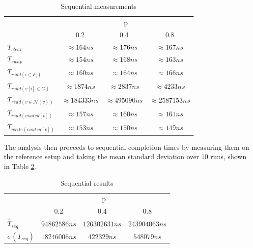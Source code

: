 \begin{table}
    \begin{center}
        \begin{tabular}{|| l | c | c | c ||}
            \hline
              & \multicolumn{3}{c||}{p} \\ \cline{2-4}
              & 0.2 & 0.4 & 0.8 \\ \hline \hline
             $T_{clear}$  & $\approx 164ns$& $\approx 176ns$& $\approx 167ns$
             \\ \hline 
             $T_{swap}$  & $\approx 154ns$& $\approx 168ns$& $\approx 163ns$
             \\ \hline 
             $T_{read(i \in F_i)}$  & $\approx 160ns$& $\approx 164ns$& $\approx 166ns$
             \\ \hline 
             $T_{read(v[i] \in G)}$  & $\approx 1874ns$& $\approx 2837ns$& $\approx 4233ns$
             \\ \hline 
             $T_{read(v \in \mathcal{N}(v))}$  & $\approx 184333ns$& $\approx 495090ns$& $\approx 2587153ns$
             \\ \hline 
             $T_{read(visited[v])}$  & $\approx 157ns$& $\approx 160ns$& $\approx 161ns$
             \\ \hline 
             $T_{write(visited[v])}$  & $\approx 153ns$& $\approx 150ns$& $\approx 149ns$
             \\ \hline
            \hline
        \end{tabular}
    \end{center}
    \label{tab:seq-meas}
    \caption{Sequential  measurements}
\end{table}
The analysis then proceeds to sequential completion 
times by measuring them on the reference setup and 
taking the mean 
standard deviation over 10 runs, shown in Table \ref{tab:seq-results}.
\begin{table}
    \begin{center}
        \begin{tabular}{|| l | c | c | c ||}
            \hline
              & \multicolumn{3}{c||}{p} \\ \cline{2-4}
              & 0.2 & 0.4 & 0.8 \\ \hline \hline
             $\bar{T}_{seq}$ & $94862586ns$ & $126302631ns$ & $243904063ns$ \\ \hline
             $\sigma(T_{seq})$ & $18246006ns$ & $422329ns$ & $548079ns$ \\ \hline
            \hline
        \end{tabular}
    \end{center}
    \label{tab:seq-results}
    \caption{Sequential results}
\end{table}

